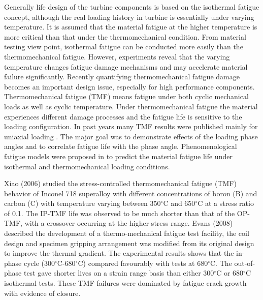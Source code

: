 Generally life design of the turbine components is based on the isothermal fatigue concept, although the real loading history in turbine is essentially under varying temperature. It is assumed that the material fatigue at the higher temperature is more critical than that under the thermomechanical condition. From material testing view point, isothermal fatigue can be conducted more easily than the thermomechanical fatigue. However, experiments reveal that the varying temperature changes fatigue damage mechanisms and may accelerate material failure significantly. Recently quantifying thermomechanical fatigue damage becomes an important design issue, especially for high performance components.
Thermomechanical fatigue (TMF) means fatigue under both cyclic mechanical loads as well as cyclic temperature. Under thermomechanical fatigue the material experiences different damage processes and the fatigue life is sensitive to the loading configuration. In past years many TMF results were published mainly for uniaxial loading \cite{Evans2008, Kulawinski2015, remy2003thermal, Bauer2009}. The major goal was to demonstrate effects of the loading phase angles and to correlate fatigue life with the phase angle. Phenomenological fatigue models were proposed in \cite{Vose2013} to predict the material fatigue life under isothermal and thermomechanical loading conditions. 

Xiao (2006) \cite{Xiao2006157} studied the stress-controlled thermomechanical fatigue (TMF) behavior of Inconel 718 superalloy with different concentrations of boron (B) and carbon (C) with temperature varying between 350$^{\circ}$C and 650$^{\circ}$C at a stress ratio of 0.1. The IP-TMF life was observed to be much shorter than that of the OP-TMF, with a crossover occurring at the higher stress range.
Evans (2008) \cite{evans2008thermo} described the development of a thermo-mechanical fatigue test facility, the coil design and specimen gripping arrangement was modified from its original design to improve the thermal gradient.
The experimental results shows that the in-phase cycle (300$^{\circ}$C-680$^{\circ}$C) compared favourably with tests at 680$^{\circ}$C.
The out-of-phase test gave shorter lives on a strain range basis than either 300$^{\circ}$C or 680$^{\circ}$C isothermal tests.
These TMF failures were dominated by fatigue crack growth with evidence of closure.

